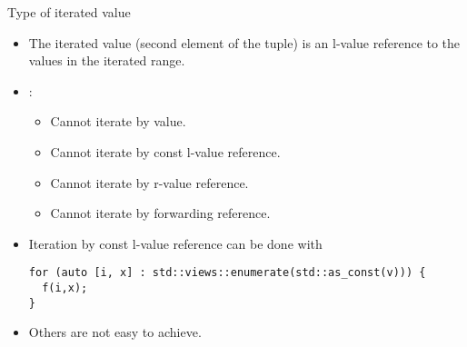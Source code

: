 \begin{frame}[t,fragile]{Type of iterated value}
\begin{itemize}
  \item The iterated value (second element of the tuple) is an l-value reference
        to the values in the iterated range.

  \item {}:
    \begin{itemize}
      \item Cannot iterate by value.
      \item Cannot iterate by const l-value reference.
      \item Cannot iterate by r-value reference.
      \item Cannot iterate by forwarding reference.
    \end{itemize}

  \item Iteration by const l-value reference can be done with
\begin{lstlisting}
for (auto [i, x] : std::views::enumerate(std::as_const(v))) {
  f(i,x);
}
\end{lstlisting}

  \item Others are not easy to achieve.

\end{itemize}
\end{frame}
